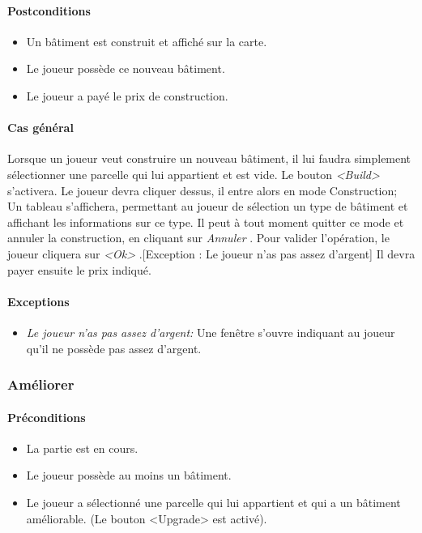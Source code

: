 \documentclass[a4paper,11pt]{report}
\begin{document}
\paragraph{Postconditions}
\begin{itemize}
 \item Un bâtiment est construit et affiché sur la carte.
 \item Le joueur possède ce nouveau bâtiment.
 \item Le joueur a payé le prix de construction.
\end{itemize}
\paragraph{Cas général}
Lorsque un joueur veut construire un nouveau bâtiment, il lui faudra simplement sélectionner une parcelle qui lui appartient et est vide. Le bouton \og \textit{<Build>} \fg s'activera. Le joueur devra cliquer dessus, il entre alors en mode Construction; Un tableau s'affichera, permettant au joueur de sélection un type de bâtiment et affichant les informations sur ce type. Il peut à tout moment quitter ce mode et annuler la construction, en cliquant sur \og \textit{Annuler} \fg. Pour valider l'opération, le joueur cliquera sur \og \textit{<Ok>} \fg.[Exception : Le joueur n'as pas assez d'argent] Il devra payer ensuite le prix indiqué.
\paragraph{Exceptions}
\begin{itemize}
 \item \textit{Le joueur n'as pas assez d'argent:}  Une fenêtre s'ouvre indiquant au joueur qu'il ne possède pas assez d'argent.
\end{itemize}
\subsubsection{Améliorer}
\paragraph{Préconditions}
\begin{itemize}
 \item La partie est en cours.
 \item Le joueur possède au moins un bâtiment.
 \item Le joueur a sélectionné une parcelle qui lui appartient et qui a un bâtiment améliorable. (Le bouton <Upgrade> est activé).
\end{itemize}
\end{document}
